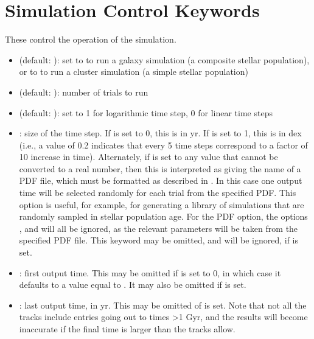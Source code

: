 \documentclass[letterpaper,10pt,english]{sphinxmanual}
\begin{document}
\section{Simulation Control Keywords}
\label{\detokenize{parameters:simulation-control-keywords}}
These control the operation of the simulation.
\begin{itemize}
\item {} 
 (default: ): set to  to run a galaxy simulation (a composite stellar population), or to  to run a cluster simulation (a simple stellar population)

\item {} 
 (default: ): number of trials to run

\item {} 
 (default: ): set to 1 for logarithmic time step, 0 for linear time steps

\item {} 
: size of the time step. If  is set to 0, this is in yr. If  is set to 1, this is in dex (i.e., a value of 0.2 indicates that every 5 time steps correspond to a factor of 10 increase in time). Alternately, if  is set to any value that cannot be converted to a real number, then this is interpreted as giving the name of a PDF file, which must be formatted as described in {\hyperref[\detokenize{pdfs:sec-pdfs}]{}}. In this case one output time will be selected randomly for each trial from the specified PDF. This option is useful, for example, for generating a library of simulations that are randomly sampled in stellar population age. For the PDF option, the options ,  and  will all be ignored, as the relevant parameters will be taken from the specified PDF file. This keyword may be omitted, and will be ignored, if  is set.

\item {} 
: first output time. This may be omitted if  is set to 0, in which case it defaults to a value equal to . It may also be omitted if  is set.

\item {} 
: last output time, in yr. This may be omitted of  is set. Note that not all the tracks include entries going out to times \textgreater{}1 Gyr, and the results will become inaccurate if the final time is larger than the tracks allow.


\end{itemize}
\end{document}
